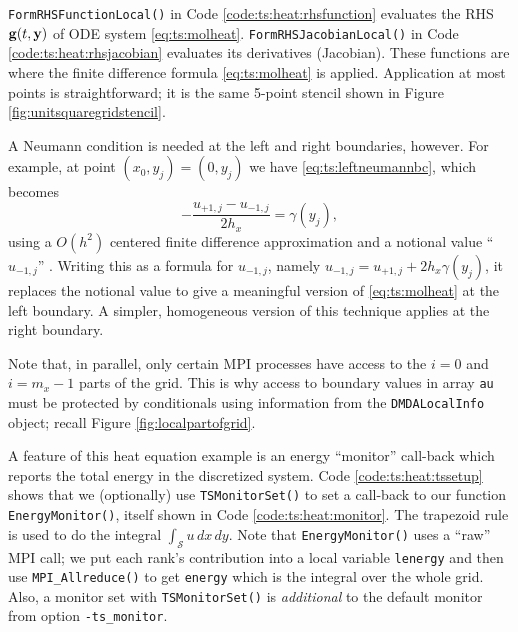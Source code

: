 \texttt{FormRHSFunctionLocal()} in Code \ref{code:ts:heat:rhsfunction} evaluates the RHS $\mathbf{g}(t,\mathbf{y})$ of ODE system \eqref{eq:ts:molheat}.  \texttt{FormRHSJacobianLocal()} in Code \ref{code:ts:heat:rhsjacobian} evaluates its derivatives (Jacobian).  These functions are where the finite difference formula \eqref{eq:ts:molheat} is applied.  Application at most points is straightforward; it is the same 5-point stencil shown in Figure \ref{fig:unitsquaregridstencil}.

A Neumann condition is needed at the left and right boundaries, however.  For example, at point $(x_0,y_j)=(0,y_j)$ we have \eqref{eq:ts:leftneumannbc}, which becomes
     $$- \frac{u_{+1,j} - u_{-1,j}}{2 h_x} = \gamma(y_j),$$
using a $O(h^2)$ centered finite difference approximation and a notional value ``$u_{-1,j}$'' \citep{MortonMayers2005}.  Writing this as a formula for $u_{-1,j}$, namely $u_{-1,j} = u_{+1,j} + 2 h_x \gamma(y_j)$, it replaces the notional value to give a meaningful version of \eqref{eq:ts:molheat} at the left boundary.  A simpler, homogeneous version of this technique applies at the right boundary.

Note that, in parallel, only certain MPI processes have access to the $i=0$ and $i=m_x-1$ parts of the grid.  This is why access to boundary values in array \texttt{au} must be protected by conditionals using information from the \texttt{DMDALocalInfo} object; recall Figure \ref{fig:localpartofgrid}.


A feature of this heat equation example is an energy ``monitor'' call-back which reports the total energy in the discretized system.  Code \ref{code:ts:heat:tssetup} shows that we (optionally) use \texttt{TSMonitorSet()} to set a call-back to our function \texttt{EnergyMonitor()}, itself shown in Code \ref{code:ts:heat:monitor}.  The trapezoid rule is used to do the integral $\int_{\mathcal{S}} u\,dx\,dy$.  Note that \texttt{EnergyMonitor()} uses a ``raw'' MPI call; we put each rank's contribution into a local variable \texttt{lenergy} and then use \texttt{MPI\_Allreduce()} to get \texttt{energy} which is the integral over the whole grid.  Also, a monitor set with \texttt{TSMonitorSet()} is \emph{additional} to the default monitor from option \texttt{-ts\_monitor}.

